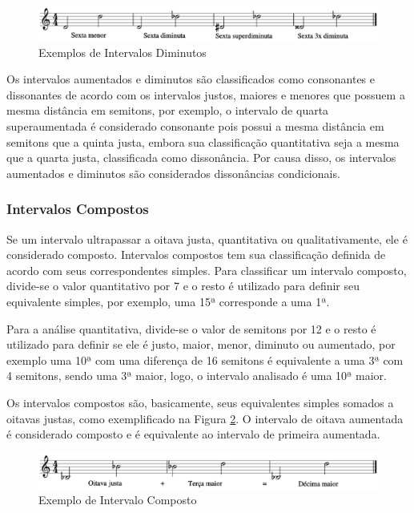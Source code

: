         \begin{figure}[htb]
          \centering
          \includegraphics[scale=0.5]{figuras/diminutas.eps}
          \caption{Exemplos de Intervalos Diminutos}
          \label{diminutas}
        \end{figure}


        Os intervalos aumentados e diminutos são classificados como consonantes e dissonantes de acordo com os intervalos justos, maiores e menores que possuem a mesma distância em semitons, por exemplo, o intervalo de quarta superaumentada é considerado consonante pois possui a mesma distância em semitons que a quinta justa, embora sua classificação quantitativa seja a mesma que a quarta justa, classificada como dissonância. Por causa disso, os intervalos aumentados e diminutos são considerados dissonâncias condicionais.

      \subsubsection[Intervalos Compostos]{Intervalos Compostos}

        Se um intervalo ultrapassar a oitava justa, quantitativa ou qualitativamente, ele é considerado composto. Intervalos compostos tem sua classificação definida de acordo com seus correspondentes simples. Para classificar um intervalo composto, divide-se o valor quantitativo por 7 e o resto é utilizado para definir seu equivalente simples, por exemplo, uma 15ª corresponde a uma 1ª.

        Para a análise quantitativa, divide-se o valor de semitons por 12 e o resto é utilizado para definir se ele é justo, maior, menor, diminuto ou aumentado, por exemplo uma 10ª com uma diferença de 16 semitons é equivalente a uma 3ª com 4 semitons, sendo uma 3ª maior, logo, o intervalo analisado é uma 10ª maior.

        Os intervalos compostos são, basicamente, seus equivalentes simples somados a oitavas justas, como exemplificado na Figura \ref{compostos}. O intervalo de oitava aumentada é considerado composto e é equivalente ao intervalo de primeira aumentada.

        \begin{figure}[htb]
          \centering
          \includegraphics[scale=0.5]{figuras/compostos.eps}
          \caption{Exemplo de Intervalo Composto}
          \label{compostos}
        \end{figure}


